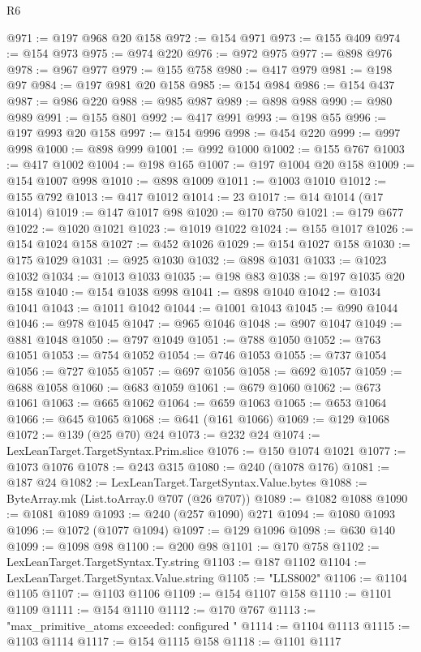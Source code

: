 \begin{lexlean}{R6}
\begin{coremodule}
{{{{{{{{{{{{{{{{{{{{{{{{{{{{{{{{{{{{{{{{{{{{{{{{{{{{{{{{{{{{{{{{{{{{{{{{@971 := @197 @968 @20 @158
@972 := @154 @971
@973 := @155 @409
@974 := @154 @973
@975 := @974 @220
@976 := @972 @975
@977 := @898 @976
@978 := @967 @977
@979 := @155 @758
@980 := @417 @979
@981 := @198 @97
@984 := @197 @981 @20 @158
@985 := @154 @984
@986 := @154 @437
@987 := @986 @220
@988 := @985 @987
@989 := @898 @988
@990 := @980 @989
@991 := @155 @801
@992 := @417 @991
@993 := @198 @55
@996 := @197 @993 @20 @158
@997 := @154 @996
@998 := @454 @220
@999 := @997 @998
@1000 := @898 @999
@1001 := @992 @1000
@1002 := @155 @767
@1003 := @417 @1002
@1004 := @198 @165
@1007 := @197 @1004 @20 @158
@1009 := @154 @1007 @998
@1010 := @898 @1009
@1011 := @1003 @1010
@1012 := @155 @792
@1013 := @417 @1012
@1014 := 23
@1017 := @14 @1014 (@17 @1014)
@1019 := @147 @1017 @98
@1020 := @170 @750
@1021 := @179 @677
@1022 := @1020 @1021
@1023 := @1019 @1022
@1024 := @155 @1017
@1026 := @154 @1024 @158
@1027 := @452 @1026
@1029 := @154 @1027 @158
@1030 := @175 @1029
@1031 := @925 @1030
@1032 := @898 @1031
@1033 := @1023 @1032
@1034 := @1013 @1033
@1035 := @198 @83
@1038 := @197 @1035 @20 @158
@1040 := @154 @1038 @998
@1041 := @898 @1040
@1042 := @1034 @1041
@1043 := @1011 @1042
@1044 := @1001 @1043
@1045 := @990 @1044
@1046 := @978 @1045
@1047 := @965 @1046
@1048 := @907 @1047
@1049 := @881 @1048
@1050 := @797 @1049
@1051 := @788 @1050
@1052 := @763 @1051
@1053 := @754 @1052
@1054 := @746 @1053
@1055 := @737 @1054
@1056 := @727 @1055
@1057 := @697 @1056
@1058 := @692 @1057
@1059 := @688 @1058
@1060 := @683 @1059
@1061 := @679 @1060
@1062 := @673 @1061
@1063 := @665 @1062
@1064 := @659 @1063
@1065 := @653 @1064
@1066 := @645 @1065
@1068 := @641 (@161 @1066)
@1069 := @129 @1068
@1072 := @139 (@25 @70) @24
@1073 := @232 @24
@1074 := LexLeanTarget.TargetSyntax.Prim.slice
@1076 := @150 @1074 @1021
@1077 := @1073 @1076
@1078 := @243 @315
@1080 := @240 (@1078 @176)
@1081 := @187 @24
@1082 := LexLeanTarget.TargetSyntax.Value.bytes
@1088 := ByteArray.mk (List.toArray.{0} @707 (@26 @707))
@1089 := @1082 @1088
@1090 := @1081 @1089
@1093 := @240 (@257 @1090) @271
@1094 := @1080 @1093
@1096 := @1072 (@1077 @1094)
@1097 := @129 @1096
@1098 := @630 @140
@1099 := @1098 @98
@1100 := @200 @98
@1101 := @170 @758
@1102 := LexLeanTarget.TargetSyntax.Ty.string
@1103 := @187 @1102
@1104 := LexLeanTarget.TargetSyntax.Value.string
@1105 := "LLS8002"
@1106 := @1104 @1105
@1107 := @1103 @1106
@1109 := @154 @1107 @158
@1110 := @1101 @1109
@1111 := @154 @1110
@1112 := @170 @767
@1113 := "max_primitive_atoms exceeded: configured "
@1114 := @1104 @1113
@1115 := @1103 @1114
@1117 := @154 @1115 @158
@1118 := @1101 @1117
}}}}}}}}}}}}}}}}}}}}}}}}}}}}}}}}}}}}}}}}}}}}}}}}}}}}}}}}}}}}}}}}}}}}}}}}
\end{coremodule}
\end{lexlean}
